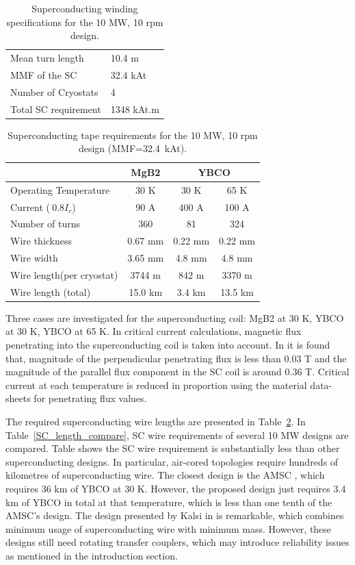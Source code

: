 \documentclass[12pt]{iopart}
\begin{document}
\begin{table}[]
  \centering
  \begin{tabular}{ll}
\hline
Mean turn length & 10.4 m \\
MMF of the SC & 32.4 kAt \\
Number of Cryostats & 4 \\
Total SC requirement & 1348 kAt.m \\
\hline
 \end{tabular}
  \caption{Superconducting winding specifications for the 10 MW, 10 rpm design.}
  \label{10MW_hts_spec}
\end{table}

\begin{table}[t]
  \centering
  \begin{tabular}{lccc}
& MgB2 & \multicolumn{2}{c}{YBCO} \\
\hline
Operating Temperature & 30 K & 30 K & 65 K \\
Current ($~0.8I_c$) & 90 A & 400 A & 100 A \\
Number of turns & 360 & 81 & 324 \\
Wire thickness & 0.67 mm & 0.22 mm & 0.22 mm \\
Wire width & 3.65 mm & 4.8 mm & 4.8 mm \\
Wire length(per cryostat) & 3744 m & 842 m & 3370 m \\
Wire length (total) & 15.0 km & 3.4 km & 13.5 km \\
\hline
 \end{tabular}
  \caption{Superconducting tape requirements for the 10 MW, 10 rpm design (MMF=32.4~kAt).}
  \label{10MW_hts_wire_spec}
\end{table}

Three cases are investigated for the superconducting coil: MgB2 at 30 K, YBCO at 30 K, YBCO at 65 K. In critical current calculations, magnetic flux penetrating into the superconducting coil is taken into account. In \cite{Keysan2012a} it is found that, magnitude of the perpendicular penetrating flux is less than 0.03 T and the magnitude of the parallel flux component in the SC coil is around 0.36 T. Critical current at each temperature is reduced in proportion using the material data-sheets for penetrating flux values.

The required superconducting wire lengths are presented in Table~\ref{10MW_hts_wire_spec}. In Table~\ref{SC_length_compare}, SC wire requirements of several 10 MW designs are compared. Table shows the SC wire requirement is substantially less than other superconducting designs. In particular, air-cored topologies require hundreds of kilometres of superconducting wire. The closest design is the AMSC \cite{Snitchler2011}, which requires 36 km of YBCO at 30 K. However, the proposed design just requires 3.4 km of YBCO in total at that temperature, which is less than one tenth of the AMSC's design. The design presented by Kalsi in \cite{Kalsi2013} is remarkable, which combines minimum usage of superconducting wire with minimum mass. However, these designs still need rotating transfer couplers, which may introduce reliability issues as mentioned in the introduction section.
\end{document}
